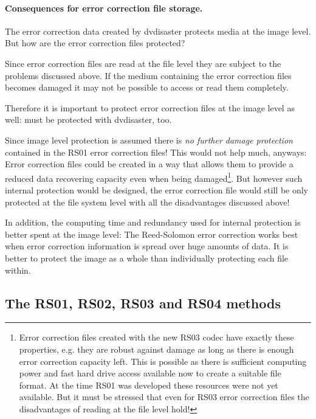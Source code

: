 \paragraph{Consequences for error correction file storage.} \label{background-image-level-consequences}The error correction data 
created by dvdisaster protects media at the image level. But how are the error correction 
files protected?

\smallskip

Since error correction files are read at the file level they are subject to the 
problems discussed above. If the medium containing the error correction files 
becomes damaged it may not be possible to access or read them completely.

Therefore it is important to protect error correction files at the image level as 
well:  must be 
protected with dvdisaster, too.

Since image level protection is assumed there is {\em no further damage protection}
contained in the RS01 error correction files! This would not help much, anyways: 
Error correction files could be created in a way that allows them to provide a 
reduced data recovering capacity even when being damaged\footnote{Error correction files 
created with the new RS03 codec have exactly these properties, e.g. they are robust 
against damage as long as there is enough error correction capacity left. This is 
possible as there is sufficient computing power and fast hard drive access available 
now to create a suitable file format. At the time RS01 was developed these resources 
were not yet available. But it must be stressed that even for RS03 error correction 
files the disadvantages of reading at the file level hold!}. But 
however such internal protection would be designed, the error correction file would 
still be only protected at the file system level with all the disadvantages discussed above!

In addition, the computing time and redundancy used for internal protection is 
better spent at the image level: The Reed-Solomon error correction works best
 when error correction information is spread over huge amounts of data. It is 
better to protect the image as a whole than individually protecting each file within.

 
\subsection{The RS01, RS02, RS03 and RS04 methods}
\label{background-methods}

